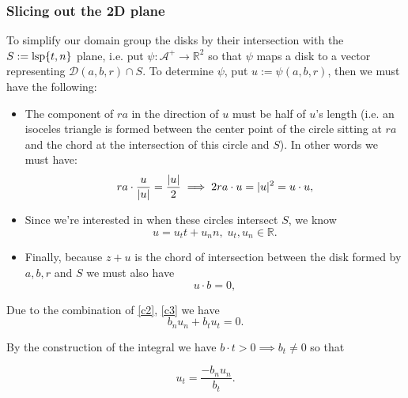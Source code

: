 \documentclass{article}
\newcommand{\lsp}[1]{\mathrm{lsp}\braces{#1}}
\begin{document}
\subsubsection{Slicing out the 2D plane}%
To simplify our domain group the disks by their intersection with the $S := \lsp{t, n}$ plane, i.e. put $\psi : \mathcal{A}^+ \to \mathbb{R}^2$ so that $\psi$ maps a disk to a vector representing $\mathcal{D}(a, b, r) \cap S$. To determine $\psi$, put $u := \psi(a, b, r)$, then we must have the following:
\begin{itemize}
  \item The component of $ra$ in the direction of $u$ must be half of $u$'s length (i.e. an isoceles triangle is formed between the center point of the circle sitting at $ra$ and the chord at the intersection of this circle and $S$). In other words we must have:
    \begin{equation}
      ra \cdot \frac{u}{\lvert u\rvert} = \frac{\lvert u\rvert}{2} \implies 2 ra \cdot u = \lvert u\rvert^2 = u\cdot u, \label{c1}
    \end{equation}
  \item Since we're interested in when these circles intersect $S$, we know
    \begin{equation}
      u = u_t t + u_n n, \; u_t, u_n \in \mathbb{R}. \label{c3}
    \end{equation}
  \item Finally, because $z + u$ is the chord of intersection between the disk formed by $a, b, r$ and $S$ we must also have
    \begin{equation}
      u \cdot b = 0, \label{c2}
    \end{equation}
\end{itemize}
Due to the combination of \eqref{c2}, \eqref{c3} we have
$$
  b_n u_n + b_t u_t = 0.
$$

By the construction of the integral we have $b \cdot t > 0 \implies b_t \neq 0$ so that

\begin{equation}
  u_t = \frac{-b_n u_n}{b_t}. \label{e4}
\end{equation}
\end{document}
